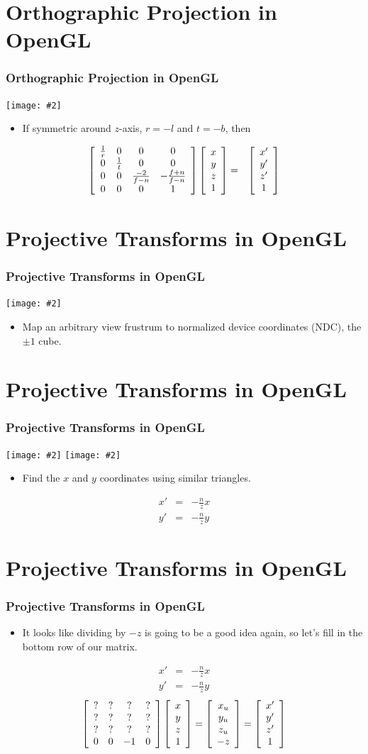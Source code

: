 \documentclass[slidestop,xcolor=pst]{beamer}
\newcommand{\graphc}[2]{\centerline{\texttt{[image: \#2]}}}
\newcommand{\graph}[2]{{\texttt{[image: \#2]}}}
\newcommand{\sect}[1]{
\section{#1}
\begin{frame}[fragile]\frametitle{#1}
}
\begin{document}
\sect{Orthographic Projection in OpenGL}
\graphc{.9}{gl_projectionmatrix02.png}
\begin{itemize}
\item If symmetric around $z$-axis, $r=-l$ and $t=-b$, then
\end{itemize}
\begin{eqnarray*}
\left[\begin{array}{cccc} \frac{1}{r} & 0 & 0 & 0 \\ 0 & \frac{1}{t} & 0 & 0 \\ 0 & 0 & \frac{-2}{f-n} & -\frac{f+n}{f-n} \\0&0&0&1\end{array}\right]
\left[\begin{array}{c} x\\y\\z \\ 1\end{array}\right] 
&=&
\left[\begin{array}{c} x'\\y'\\z' \\ 1\end{array}\right]
\end{eqnarray*}
\end{frame}


\sect{Projective Transforms in OpenGL}
\graphc{1}{gl_projectionmatrix01.png}
\begin{itemize}
\item Map an arbitrary view frustrum to
  normalized device coordinates (NDC), the $\pm 1$ cube.
\end{itemize}
\end{frame}

\sect{Projective Transforms in OpenGL}
\graph{.49}{gl_projectionmatrix03.png}\hfill
\graph{.49}{gl_projectionmatrix04.png}
\begin{itemize}
\item Find the $x$ and $y$ coordinates using similar triangles.
\end{itemize}
\begin{eqnarray*}
x' &=& -\frac{n}{z}x\\
y' &=& -\frac{n}{z}y
\end{eqnarray*}
\end{frame}

\sect{Projective Transforms in OpenGL}
\begin{itemize}
\item It looks like dividing by $-z$ is going to be a good idea again,
  so let's fill in the bottom row of our matrix.
\end{itemize}
\begin{eqnarray*}
x' &=& -\frac{n}{z}x\\
y' &=& -\frac{n}{z}y
\end{eqnarray*}\pause
\[\left[\begin{array}{cccc} ?&?&?&? \\ ?&?&?&? \\ ?&?&?&? \\ 0&0&-1&0\end{array}\right]\left[\begin{array}{c} x\\y\\z \\ 1\end{array}\right]
=\left[\begin{array}{c} x_u\\y_u\\z_u\\-z \end{array}\right]
=\left[\begin{array}{c} x'\\y'\\z' \\ 1\end{array}\right]
\]
\end{frame}
\end{document}
